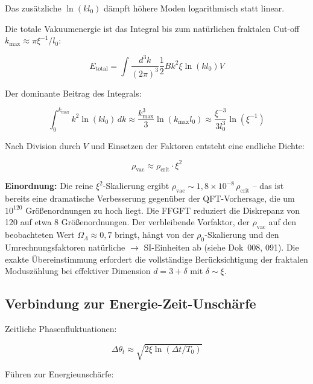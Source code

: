 	Das zusätzliche \(\ln(k l_0)\) dämpft höhere Moden logarithmisch statt linear.
	
	Die totale Vakuumenergie ist das Integral bis zum natürlichen fraktalen Cut-off \(k_{\max} \approx \pi \xi^{-1} / l_0\):
	
	\begin{equation}
		E_{\text{total}} = \int \frac{d^3k}{(2\pi)^3} \frac{1}{2} B k^2 \xi \ln(k l_0) V
	\end{equation}
	
	Der dominante Beitrag des Integrals:
	
	\begin{equation}
		\int_0^{k_{\max}} k^2 \ln(k l_0) \, dk \approx \frac{k_{\max}^3}{3} \ln(k_{\max} l_0) \approx \frac{\xi^{-3}}{3 l_0^3} \ln(\xi^{-1})
	\end{equation}
	
	Nach Division durch \(V\) und Einsetzen der Faktoren entsteht eine endliche Dichte:
	
	\begin{equation}
		\rho_{\text{vac}} \approx \rho_{\text{crit}} \cdot \xi^2
	\end{equation}
	
	\textbf{Einordnung:} Die reine \(\xi^2\)-Skalierung ergibt \(\rho_{\text{vac}} \sim 1{,}8 \times 10^{-8} \, \rho_{\text{crit}}\) -- das ist bereits eine dramatische Verbesserung gegenüber der QFT-Vorhersage, die um \(10^{120}\) Größenordnungen zu hoch liegt. Die FFGFT reduziert die Diskrepanz von 120 auf etwa 8 Größenordnungen. Der verbleibende Vorfaktor, der \(\rho_{\text{vac}}\) auf den beobachteten Wert \(\Omega_\Lambda \approx 0{,}7\) bringt, hängt von der \(\rho_0\)-Skalierung und den Umrechnungsfaktoren natürliche \(\to\) SI-Einheiten ab (siehe Dok~008, 091). Die exakte Übereinstimmung erfordert die vollständige Berücksichtigung der fraktalen Moduszählung bei effektiver Dimension \(d = 3 + \delta\) mit \(\delta \sim \xi\).
	
	\subsection*{Verbindung zur Energie-Zeit-Unschärfe}
	
	Zeitliche Phasenfluktuationen:
	
	\begin{equation}
		\Delta \theta_t \approx \sqrt{2 \xi \ln(\Delta t / T_0)}
	\end{equation}
	
	Führen zur Energieunschärfe:
	
